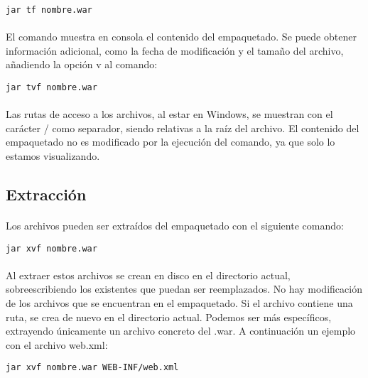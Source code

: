 \documentclass{article}
\begin{document}
	\begin{center}
		\texttt{jar tf nombre.war}
	\end{center}
	
	\paragraph{}El comando muestra en consola el contenido del empaquetado. Se puede obtener información adicional, como la fecha de modificación y el tamaño del archivo, añadiendo la opción v al comando:
	
	\begin{center}
		\texttt{jar tvf nombre.war}
	\end{center}
	
	\paragraph{}Las rutas de acceso a los archivos, al estar en Windows, se muestran con el carácter / como separador, siendo relativas a la raíz del archivo. El contenido del empaquetado no es modificado por la ejecución del comando, ya que solo lo estamos visualizando.
	
	\subsection{Extracción}
	
	\paragraph{}Los archivos pueden ser extraídos del empaquetado con el siguiente comando:

	\begin{center}
		\texttt{jar xvf nombre.war}
	\end{center}
	
	\paragraph{}Al extraer estos archivos se crean en disco en el directorio actual, sobreescribiendo los existentes que puedan ser reemplazados. No hay modificación de los archivos que se encuentran en el empaquetado. Si el archivo contiene una ruta, se crea de nuevo en el directorio actual. Podemos ser más específicos, extrayendo únicamente un archivo concreto del .war. A continuación un ejemplo con el archivo web.xml:
	
	\begin{center}
		\texttt{jar xvf nombre.war WEB-INF/web.xml}
	\end{center}
	
\end{document}
